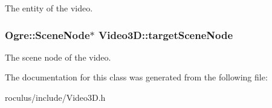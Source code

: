 \-The entity of the video. \hypertarget{classVideo3D_ab3e0e29264b1e813c3075bc0d562a2e8}{
\subsubsection[{target\-Scene\-Node}]{\setlength{\rightskip}{0pt plus 5cm}\-Ogre\-::\-Scene\-Node$\ast$ {\bf \-Video3\-D\-::target\-Scene\-Node}}}\label{classVideo3D_ab3e0e29264b1e813c3075bc0d562a2e8}
\-The scene node of the video. 

\-The documentation for this class was generated from the following file\-:\begin{DoxyCompactItemize}
\item 
roculus/include/\-Video3\-D.\-h\end{DoxyCompactItemize}
